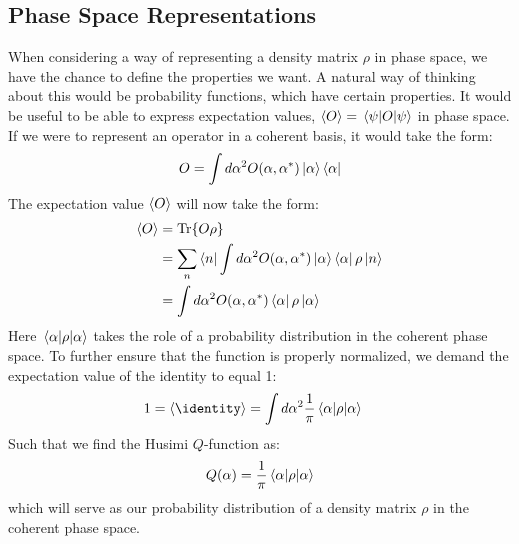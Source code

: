 \subsection{Phase Space Representations}
 \noindent
When considering a way of representing a density matrix $\rho$ in phase space, we have the chance to define the properties we want. A natural way of thinking about this would be probability functions, which have certain properties. It would be useful to be able to express expectation values, $\expval{O} = \mel{\psi}{O}{\psi}$ in phase space. If we were to represent an operator in a coherent basis, it would take the form:
\begin{equation}
    O = \int d\alpha^2 O(\alpha, \alpha^*)\ket{\alpha}\bra{\alpha} 
\end{equation}
The expectation value $\expval{O}$ will now take the form: 
\begin{align*}
    \expval{O} &= \Tr{O \rho} \\
               &= \sum_n \bra{n} \int d\alpha^2 O(\alpha, \alpha^*)\ket{\alpha}\bra{\alpha} \rho \ket{n} \\
               &= \int d\alpha^2 O(\alpha, \alpha^*)\bra{\alpha} \rho \ket{\alpha}
\end{align*}
Here $\mel{\alpha}{\rho}{\alpha}$ takes the role of a probability distribution in the coherent phase space. To further ensure that the function is properly normalized, we demand the expectation value of the identity to equal 1:
\begin{align*}
    1 = \expval{\identity} &= \int d\alpha^2 \frac{1}{\pi} \mel{\alpha}{\rho}{\alpha}
\end{align*}
Such that we find the Husimi $Q$-function as:
\begin{equation}
    Q(\alpha) =  \frac{1}{\pi} \mel{\alpha}{\rho}{\alpha}
\end{equation}
which will serve as our probability distribution of a density matrix $\rho$ in the coherent phase space.
